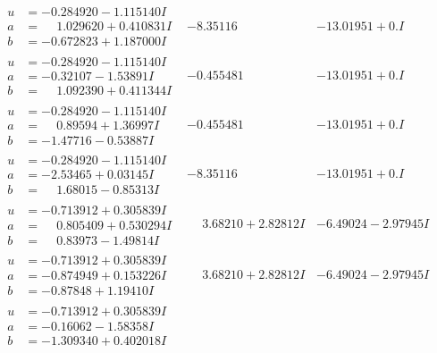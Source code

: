 \documentclass[1p]{elsarticle_modified}
\theoremstyle{definition}
\begin{document}
$$\begin{array}{c|c|c}
\begin{aligned}
u &= -0.284920 - 1.115140 I \\
a &= \phantom{-}1.029620 + 0.410831 I \\
b &= -0.672823 + 1.187000 I\end{aligned}
 & -8.35116\phantom{ +0.000000I} & -13.01951 + 0. I\phantom{ +0.000000I} \\ \hline\begin{aligned}
u &= -0.284920 - 1.115140 I \\
a &= -0.32107 - 1.53891 I \\
b &= \phantom{-}1.092390 + 0.411344 I\end{aligned}
 & -0.455481\phantom{ +0.000000I} & -13.01951 + 0. I\phantom{ +0.000000I} \\ \hline\begin{aligned}
u &= -0.284920 - 1.115140 I \\
a &= \phantom{-}0.89594 + 1.36997 I \\
b &= -1.47716 - 0.53887 I\end{aligned}
 & -0.455481\phantom{ +0.000000I} & -13.01951 + 0. I\phantom{ +0.000000I} \\ \hline\begin{aligned}
u &= -0.284920 - 1.115140 I \\
a &= -2.53465 + 0.03145 I \\
b &= \phantom{-}1.68015 - 0.85313 I\end{aligned}
 & -8.35116\phantom{ +0.000000I} & -13.01951 + 0. I\phantom{ +0.000000I} \\ \hline\begin{aligned}
u &= -0.713912 + 0.305839 I \\
a &= \phantom{-}0.805409 + 0.530294 I \\
b &= \phantom{-}0.83973 - 1.49814 I\end{aligned}
 & \phantom{-}3.68210 + 2.82812 I & -6.49024 - 2.97945 I \\ \hline\begin{aligned}
u &= -0.713912 + 0.305839 I \\
a &= -0.874949 + 0.153226 I \\
b &= -0.87848 + 1.19410 I\end{aligned}
 & \phantom{-}3.68210 + 2.82812 I & -6.49024 - 2.97945 I \\ \hline\begin{aligned}
u &= -0.713912 + 0.305839 I \\
a &= -0.16062 - 1.58358 I \\
b &= -1.309340 + 0.402018 I\end{aligned}

\end{array}$$
\end{document}
